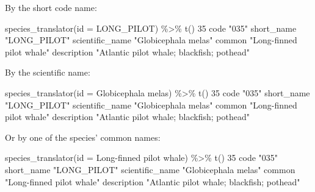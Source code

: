 \documentclass[
]{book}
\newenvironment{Shaded}{\begin{snugshade}}{\end{snugshade}}
\newcommand{\AttributeTok}[1]{\textcolor[rgb]{0.77,0.63,0.00}{#1}}
\newcommand{\DecValTok}[1]{\textcolor[rgb]{0.00,0.00,0.81}{#1}}
\newcommand{\FunctionTok}[1]{\textcolor[rgb]{0.00,0.00,0.00}{#1}}
\newcommand{\NormalTok}[1]{#1}
\newcommand{\SpecialCharTok}[1]{\textcolor[rgb]{0.00,0.00,0.00}{#1}}
\newcommand{\StringTok}[1]{\textcolor[rgb]{0.31,0.60,0.02}{#1}}
\begin{document}
By the short code name:

\begin{Shaded}
\begin{Highlighting}[]
\FunctionTok{species\_translator}\NormalTok{(}\AttributeTok{id =} \StringTok{\textquotesingle{}LONG\_PILOT\textquotesingle{}}\NormalTok{) }\SpecialCharTok{\%\textgreater{}\%} \FunctionTok{t}\NormalTok{()}
                \DecValTok{35}                                        
\NormalTok{code            }\StringTok{"035"}                                     
\NormalTok{short\_name      }\StringTok{"LONG\_PILOT"}                              
\NormalTok{scientific\_name }\StringTok{"Globicephala melas"}                      
\NormalTok{common          }\StringTok{"Long{-}finned pilot whale"}                 
\NormalTok{description     }\StringTok{"Atlantic pilot whale; blackfish; pothead"}
\end{Highlighting}
\end{Shaded}

By the scientific name:

\begin{Shaded}
\begin{Highlighting}[]
\FunctionTok{species\_translator}\NormalTok{(}\AttributeTok{id =} \StringTok{\textquotesingle{}Globicephala melas\textquotesingle{}}\NormalTok{) }\SpecialCharTok{\%\textgreater{}\%} \FunctionTok{t}\NormalTok{()}
                \DecValTok{35}                                        
\NormalTok{code            }\StringTok{"035"}                                     
\NormalTok{short\_name      }\StringTok{"LONG\_PILOT"}                              
\NormalTok{scientific\_name }\StringTok{"Globicephala melas"}                      
\NormalTok{common          }\StringTok{"Long{-}finned pilot whale"}                 
\NormalTok{description     }\StringTok{"Atlantic pilot whale; blackfish; pothead"}
\end{Highlighting}
\end{Shaded}

Or by one of the species' common names:

\begin{Shaded}
\begin{Highlighting}[]
\FunctionTok{species\_translator}\NormalTok{(}\AttributeTok{id =} \StringTok{\textquotesingle{}Long{-}finned pilot whale\textquotesingle{}}\NormalTok{) }\SpecialCharTok{\%\textgreater{}\%} \FunctionTok{t}\NormalTok{()}
                \DecValTok{35}                                        
\NormalTok{code            }\StringTok{"035"}                                     
\NormalTok{short\_name      }\StringTok{"LONG\_PILOT"}                              
\NormalTok{scientific\_name }\StringTok{"Globicephala melas"}                      
\NormalTok{common          }\StringTok{"Long{-}finned pilot whale"}                 
\NormalTok{description     }\StringTok{"Atlantic pilot whale; blackfish; pothead"}
\end{Highlighting}
\end{Shaded}
\end{document}
